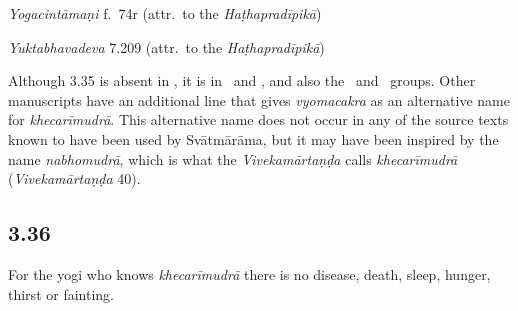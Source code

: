 \begin{ekdosis}
\begin{testimonia}[hp03_035]
\emph{Yogacintāmaṇi} f.~74r (attr.~to the \emph{Haṭhapradīpikā})
\begin{versinnote}
\end{versinnote}

\emph{Yuktabhavadeva} 7.209 (attr.~to the \emph{Haṭhapradīpikā})
\begin{versinnote}
\end{versinnote}
\end{testimonia}

\begin{philcomm}[hp03_035]
Although 3.35 is absent in \alphaOne, it is in \alphaTwo\ and \alphaThree, and also the \textgamma\ and \texteta\ groups. Other manuscripts have an additional line that gives \emph{vyomacakra} as an alternative name for \emph{khecarīmudrā}. This alternative name does not occur in any of the source texts known to have been used by Svātmārāma, but it may have been inspired by the name \emph{nabhomudrā}, which is what the \emph{Vivekamārtaṇḍa} calls \emph{khecarīmudrā} (\emph{Vivekamārtaṇḍa} 40).   
\end{philcomm}


\subsection*{3.36}
\begin{translation}[hp03_036]
For the yogi who knows \emph{khecarīmudrā} there is no disease, death, sleep, hunger, thirst or fainting.
\end{translation}


\end{ekdosis}
